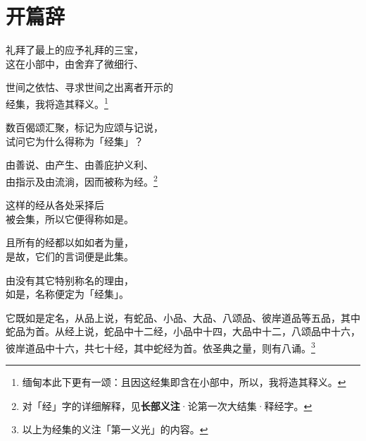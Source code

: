 \chapter{开篇辞}

\begin{quoting}礼拜了最上的应予礼拜的三宝，\\这在小部中，由舍弃了微细行、\end{quoting}

\begin{quoting}世间之依怙、寻求世间之出离者开示的\\经集，我将造其释义。\footnote{缅甸本此下更有一颂：且因这经集即含在小部中，所以，我将造其释义。}\end{quoting}

\begin{quoting}数百偈颂汇聚，标记为应颂与记说，\\试问它为什么得称为「经集」？\end{quoting}

\begin{quoting}由善说、由产生、由善庇护义利、\\由指示及由流淌，因而被称为经。\footnote{对「经」字的详细解释，见\textbf{长部义注}·论第一次大结集·释经字。}\end{quoting}

\begin{quoting}这样的经从各处采择后\\被会集，所以它便得称如是。\end{quoting}

\begin{quoting}且所有的经都以如如者为量，\\是故，它们的言词便是此集。\end{quoting}

\begin{quoting}由没有其它特别称名的理由，\\如是，名称便定为「经集」。\end{quoting}

它既如是定名，从品上说，有蛇品、小品、大品、八颂品、彼岸道品等五品，其中蛇品为首。从经上说，蛇品中十二经，小品中十四，大品中十二，八颂品中十六，彼岸道品中十六，共七十经，其中蛇经为首。依圣典之量，则有八诵。\footnote{以上为经集的义注「第一义光」的内容。}